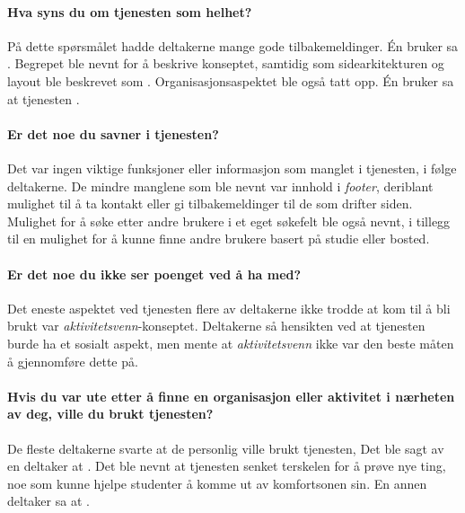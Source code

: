 \paragraph{Hva syns du om tjenesten som helhet?}
På dette spørsmålet hadde deltakerne mange gode tilbakemeldinger. Én bruker sa . Begrepet  ble nevnt for å beskrive konseptet, samtidig som sidearkitekturen og layout ble beskrevet som . Organisasjonsaspektet ble også tatt opp. Én bruker sa at tjenesten .

\paragraph{Er det noe du savner i tjenesten?}
Det var ingen viktige funksjoner eller informasjon som manglet i tjenesten, i følge deltakerne. De mindre manglene som ble nevnt var innhold i {\em  footer}, deriblant mulighet til å ta kontakt eller gi tilbakemeldinger til de som drifter siden. Mulighet for å søke etter andre brukere i et eget søkefelt ble også nevnt, i tillegg til en mulighet for å kunne finne andre brukere basert på studie eller bosted.

\paragraph{Er det noe du ikke ser poenget ved å ha med?}
Det eneste aspektet ved tjenesten flere av deltakerne ikke trodde at kom til å bli brukt var {\em  aktivitetsvenn}-konseptet. Deltakerne så hensikten ved at tjenesten burde ha et sosialt aspekt, men mente at {\em  aktivitetsvenn} ikke var den beste måten å gjennomføre dette på.

\paragraph{Hvis du var ute etter å finne en organisasjon eller aktivitet i nærheten av deg, ville du brukt tjenesten?}
De fleste deltakerne svarte at de personlig ville brukt tjenesten, Det ble sagt av en deltaker at . Det ble nevnt at tjenesten senket terskelen for å prøve nye ting, noe som kunne hjelpe studenter å komme ut av komfortsonen sin. En annen deltaker sa at .

